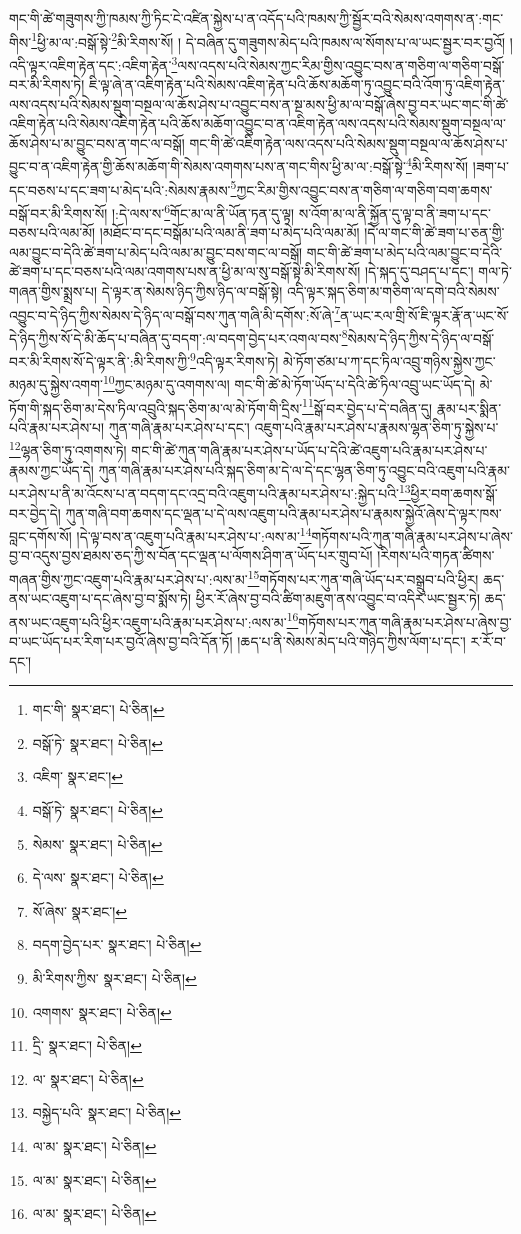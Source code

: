 གང་གི་ཚེ་གཟུགས་ཀྱི་ཁམས་ཀྱི་ཏིང་ངེ་འཛིན་སྐྱེས་པ་ན་འདོད་པའི་ཁམས་ཀྱི་སྦྱོར་བའི་སེམས་འགགས་ན་:གང་གིས་\footnote{གང་གི་  སྣར་ཐང་།  པེ་ཅིན། }ཕྱི་མ་ལ་:བསྒོ་སྟེ་\footnote{བསྒོ་ཏེ་  སྣར་ཐང་།  པེ་ཅིན། }མི་རིགས་སོ། །
དེ་བཞིན་དུ་གཟུགས་མེད་པའི་ཁམས་ལ་སོགས་པ་ལ་ཡང་སྦྱར་བར་བྱའོ། །འདི་ལྟར་འཇིག་རྟེན་དང་:འཇིག་རྟེན་\footnote{འཇིག་  སྣར་ཐང་། }ལས་འདས་པའི་སེམས་ཀྱང་རིམ་གྱིས་འབྱུང་བས་ན་གཅིག་ལ་གཅིག་བསྒོ་བར་མི་རིགས་ཏེ། ཇི་ལྟ་ཞེ་ན་འཇིག་རྟེན་པའི་སེམས་འཇིག་རྟེན་པའི་ཆོས་མཆོག་ཏུ་འབྱུང་བའི་འོག་ཏུ་འཇིག་རྟེན་ལས་འདས་པའི་སེམས་སྡུག་བསྔལ་ལ་ཆོས་ཤེས་པ་འབྱུང་བས་ན་སྔ་མས་ཕྱི་མ་ལ་བསྒོ་ཞེས་བྱ་བར་ཡང་གང་གི་ཚེ་འཇིག་རྟེན་པའི་སེམས་འཇིག་རྟེན་པའི་ཆོས་མཆོག་འབྱུང་བ་ན་འཇིག་རྟེན་ལས་འདས་པའི་སེམས་སྡུག་བསྔལ་ལ་ཆོས་ཤེས་པ་མ་བྱུང་བས་ན་གང་ལ་བསྒོ། གང་གི་ཚེ་འཇིག་རྟེན་ལས་འདས་པའི་སེམས་སྡུག་བསྔལ་ལ་ཆོས་ཤེས་པ་བྱུང་བ་ན་འཇིག་རྟེན་གྱི་ཆོས་མཆོག་གི་སེམས་འགགས་པས་ན་གང་གིས་ཕྱི་མ་ལ་:བསྒོ་སྟེ་\footnote{བསྒོ་ཏེ་  སྣར་ཐང་།  པེ་ཅིན། }མི་རིགས་སོ། །ཟག་པ་དང་བཅས་པ་དང་ཟག་པ་མེད་པའི་:སེམས་རྣམས་\footnote{སེམས་  སྣར་ཐང་།  པེ་ཅིན། }ཀྱང་རིམ་གྱིས་འབྱུང་བས་ན་གཅིག་ལ་གཅིག་བག་ཆགས་བསྒོ་བར་མི་རིགས་སོ། །:དེ་ལས་ས་\footnote{དེ་ལས་  སྣར་ཐང་།  པེ་ཅིན། }གོང་མ་ལ་ནི་ཡོན་ཏན་དུ་ལྟ། ས་འོག་མ་ལ་ནི་སྐྱོན་དུ་ལྟ་བ་ནི་ཟག་པ་དང་བཅས་པའི་ལམ་མོ། །མཐོང་བ་དང་བསྒོམ་པའི་ལམ་ནི་ཟག་པ་མེད་པའི་ལམ་མོ། །དེ་ལ་གང་གི་ཚེ་ཟག་པ་ཅན་གྱི་ལམ་བྱུང་བ་དེའི་ཚེ་ཟག་པ་མེད་པའི་ལམ་མ་བྱུང་བས་གང་ལ་བསྒོ། གང་གི་ཚེ་ཟག་པ་མེད་པའི་ལམ་བྱུང་བ་དེའི་ཚེ་ཟག་པ་དང་བཅས་པའི་ལམ་འགགས་པས་ན་ཕྱི་མ་ལ་སུ་བསྒོ་སྟེ་མི་རིགས་སོ། །དེ་སྐད་དུ་བཤད་པ་དང་། གལ་ཏེ་གཞན་གྱིས་སྨྲས་པ། དེ་ལྟར་ན་སེམས་ཉིད་ཀྱིས་ཉིད་ལ་བསྒོ་སྟེ། འདི་ལྟར་སྐད་ཅིག་མ་གཅིག་ལ་དགེ་བའི་སེམས་འབྱུང་བ་དེ་ཉིད་ཀྱིས་སེམས་དེ་ཉིད་ལ་བསྒོ་བས་ཀུན་གཞི་མི་དགོས་:སོ་ཞེ་\footnote{སོ་ཞེས་  སྣར་ཐང་། }ན་ཡང་རལ་གྲི་སོ་ཇི་ལྟར་རྣོ་ན་ཡང་སོ་དེ་ཉིད་ཀྱིས་སོ་དེ་མི་ཆོད་པ་བཞིན་དུ་བདག་:ལ་བདག་བྱེད་པར་འགལ་བས་\footnote{བདག་བྱེད་པར་  སྣར་ཐང་།  པེ་ཅིན། }སེམས་དེ་ཉིད་ཀྱིས་དེ་ཉིད་ལ་བསྒོ་བར་མི་རིགས་སོ་དེ་ལྟར་ནི་:མི་རིགས་ཀྱི་\footnote{མི་རིགས་ཀྱིས་  སྣར་ཐང་།  པེ་ཅིན། }འདི་ལྟར་རིགས་ཏེ། མེ་ཏོག་ཙམ་པ་ཀ་དང་ཏིལ་འབྲུ་གཉིས་སྐྱེས་ཀྱང་མཉམ་དུ་སྐྱེས་འགག་\footnote{འགགས་  སྣར་ཐང་།  པེ་ཅིན། }ཀྱང་མཉམ་དུ་འགགས་ལ། གང་གི་ཚེ་མེ་ཏོག་ཡོད་པ་དེའི་ཚེ་ཏིལ་འབྲུ་ཡང་ཡོད་དེ། མེ་ཏོག་གི་སྐད་ཅིག་མ་དེས་ཏིལ་འབྲུའི་སྐད་ཅིག་མ་ལ་མེ་ཏོག་གི་དྲིས་\footnote{དྲི་  སྣར་ཐང་།  པེ་ཅིན། }སྒོ་བར་བྱེད་པ་དེ་བཞིན་དུ། རྣམ་པར་སྨིན་པའི་རྣམ་པར་ཤེས་པ། ཀུན་གཞི་རྣམ་པར་ཤེས་པ་དང་། འཇུག་པའི་རྣམ་པར་ཤེས་པ་རྣམས་ལྷན་ཅིག་ཏུ་སྐྱེས་པ་\footnote{ལ་  སྣར་ཐང་།  པེ་ཅིན། }ལྷན་ཅིག་ཏུ་འགགས་ཏེ། གང་གི་ཚེ་ཀུན་གཞི་རྣམ་པར་ཤེས་པ་ཡོད་པ་དེའི་ཚེ་འཇུག་པའི་རྣམ་པར་ཤེས་པ་རྣམས་ཀྱང་ཡོད་དེ། ཀུན་གཞི་རྣམ་པར་ཤེས་པའི་སྐད་ཅིག་མ་དེ་ལ་དེ་དང་ལྷན་ཅིག་ཏུ་འབྱུང་བའི་འཇུག་པའི་རྣམ་པར་ཤེས་པ་ནི་མ་འོངས་པ་ན་བདག་དང་འདྲ་བའི་འཇུག་པའི་རྣམ་པར་ཤེས་པ་:སྐྱེད་པའི་\footnote{བསྐྱེད་པའི་  སྣར་ཐང་།  པེ་ཅིན། }ཕྱིར་བག་ཆགས་སྒོ་བར་བྱེད་དེ། ཀུན་གཞི་བག་ཆགས་དང་ལྡན་པ་དེ་ལས་འཇུག་པའི་རྣམ་པར་ཤེས་པ་རྣམས་སྐྱེའོ་ཞེས་དེ་ལྟར་ཁས་བླང་དགོས་སོ། །དེ་ལྟ་བས་ན་འཇུག་པའི་རྣམ་པར་ཤེས་པ་:ལས་མ་\footnote{ལ་མ་  སྣར་ཐང་།  པེ་ཅིན། }གཏོགས་པའི་ཀུན་གཞི་རྣམ་པར་ཤེས་པ་ཞེས་བྱ་བ་འདུས་བྱས་ཐམས་ཅད་ཀྱི་ས་བོན་དང་ལྡན་པ་ལོགས་ཤིག་ན་ཡོད་པར་གྲུབ་པོ། །རིགས་པའི་གཏན་ཚིགས་གཞན་གྱིས་ཀྱང་འཇུག་པའི་རྣམ་པར་ཤེས་པ་:ལས་མ་\footnote{ལ་མ་  སྣར་ཐང་།  པེ་ཅིན། }གཏོགས་པར་ཀུན་གཞི་ཡོད་པར་བསྒྲུབ་པའི་ཕྱིར། ཆད་ནས་ཡང་འཇུག་པ་དང་ཞེས་བྱ་བ་སྨོས་ཏེ། ཕྱིར་རོ་ཞེས་བྱ་བའི་ཚིག་མཇུག་ནས་འབྱུང་བ་འདིར་ཡང་སྦྱར་ཏེ། ཆད་ནས་ཡང་འཇུག་པའི་ཕྱིར་འཇུག་པའི་རྣམ་པར་ཤེས་པ་:ལས་མ་\footnote{ལ་མ་  སྣར་ཐང་།  པེ་ཅིན། }གཏོགས་པར་ཀུན་གཞི་རྣམ་པར་ཤེས་པ་ཞེས་བྱ་བ་ཡང་ཡོད་པར་རིག་པར་བྱའོ་ཞེས་བྱ་བའི་དོན་ཏོ། །ཆད་པ་ནི་སེམས་མེད་པའི་གཉིད་ཀྱིས་ལོག་པ་དང་། ར་རོ་བ་དང་། 